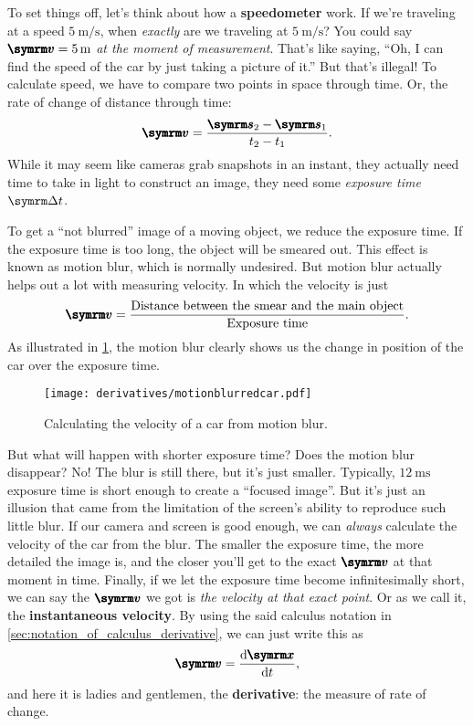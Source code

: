 To set things off, let's think about how a \textbf{speedometer} work. If we're traveling at a speed $\qty{5}{\meter\per\second}$, when \emph{exactly} are we traveling at $\qty{5}{\meter\per\second}$? You could say $\vv{v} = \qty{5}{\meter}$ \emph{at the moment of measurement}. That's like saying, \enquote{Oh, I can find the speed of the car by just taking a picture of it.} But that's illegal! To calculate speed, we have to compare two points in space through time. Or, the rate of change of distance through time:
\begin{equation}
    \vv{v} = \frac{\vv{s}_2 - \vv{s}_1}{t_2 - t_1}.
\end{equation}
While it may seem like cameras grab snapshots in an instant, they actually need time to take in light to construct an image, they need some \emph{exposure time} $\Dd{t}$.

To get a \enquote{not blurred} image of a moving object, we reduce the exposure time. If the exposure time is too long, the object will be smeared out. This effect is known as motion blur, which is normally undesired. But motion blur actually helps out a lot with measuring velocity. In which the velocity is just 
\begin{equation}
    \vv{v} = \frac{\textrm{Distance between the smear and the main object}}{\textrm{Exposure time}}.
\end{equation}
As illustrated in \cref{fig:car-motion-blur}, the motion blur clearly shows us the change in position of the car over the exposure time.
\begin{figure}[ht]
   \centering
   \texttt{[image: derivatives/motionblurredcar.pdf]} 
   \caption{Calculating the velocity of a car from motion blur.}
   \label{fig:car-motion-blur}
\end{figure}

But what will happen with shorter exposure time? Does the motion blur disappear? No! The blur is still there, but it's just smaller. Typically, $\qty{12}{\ms}$ exposure time is short enough to create a ``focused image''. But it's just an illusion that came from the limitation of the screen's ability to reproduce such little blur. If our camera and screen is good enough, we can \emph{always} calculate the velocity of the car from the blur. The smaller the exposure time, the more detailed the image is, and the closer you'll get to the exact $\vv{v}$ at that moment in time. Finally, if we let the exposure time become infinitesimally short, we can say the $\vv{v}$ we got is \emph{the velocity at that exact point}. Or as we call it, the \textbf{instantaneous velocity}. By using the said calculus notation in \cref{sec:notation_of_calculus_derivative}, we can just write this as
\begin{equation}
    \vv{v} = \odv{\vv{x}}{t}, \label{eq:first_intro_to_derivative}
\end{equation}
and here it is ladies and gentlemen, the \textbf{derivative}: the measure of rate of change.


